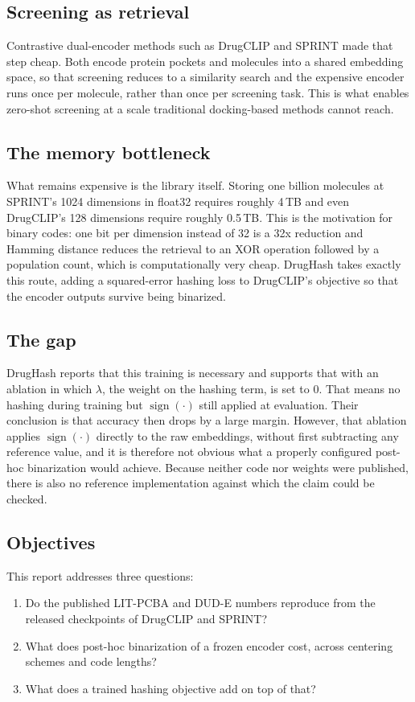 \documentclass[10pt,a4paper]{article}
\begin{document}
\subsection{Screening as retrieval}
Contrastive dual-encoder methods such as DrugCLIP \citep{bib:drugclip} and SPRINT
\citep{bib:sprint} made that step cheap. Both encode
protein pockets and molecules into a shared embedding space, so that screening reduces to a
similarity search and the expensive encoder runs once per molecule, rather than once per
screening task. This is what enables zero-shot screening at a scale traditional docking-based
methods cannot reach.

\subsection{The memory bottleneck}
What remains expensive is the library itself. Storing one billion molecules at SPRINT's 1024
dimensions in float32 requires roughly 4\,TB and even DrugCLIP's 128 dimensions require
roughly 0.5\,TB. This is the motivation for binary codes: one bit per dimension instead of 32
is a 32x reduction and Hamming distance reduces the retrieval to an XOR operation followed by
a population count, which is computationally very cheap. DrugHash \citep{bib:drughash} takes exactly this route,
adding a squared-error hashing loss to DrugCLIP's objective so that the encoder outputs
survive being binarized.

\subsection{The gap}
DrugHash reports that this training is necessary and supports that with an ablation in which
$\lambda$, the weight on the hashing term, is set to 0. That means no hashing during training
but $\operatorname{sign}(\cdot)$ still applied at evaluation. Their conclusion is that
accuracy then drops by a large margin. However, that ablation applies
$\operatorname{sign}(\cdot)$ directly to the raw embeddings, without first subtracting any
reference value, and it is therefore not obvious what a properly configured post-hoc
binarization would achieve. Because neither code nor weights were published, there is also no
reference implementation against which the claim could be checked.

\subsection{Objectives}
This report addresses three questions:
\begin{enumerate}[leftmargin=*]
\item Do the published LIT-PCBA \citep{bib:litpcba} and DUD-E \citep{bib:dude} numbers reproduce from the released checkpoints of
DrugCLIP and SPRINT?
\item What does post-hoc binarization of a frozen encoder cost, across centering schemes and
code lengths?
\item What does a trained hashing objective add on top of that?
\end{enumerate}
\end{document}
